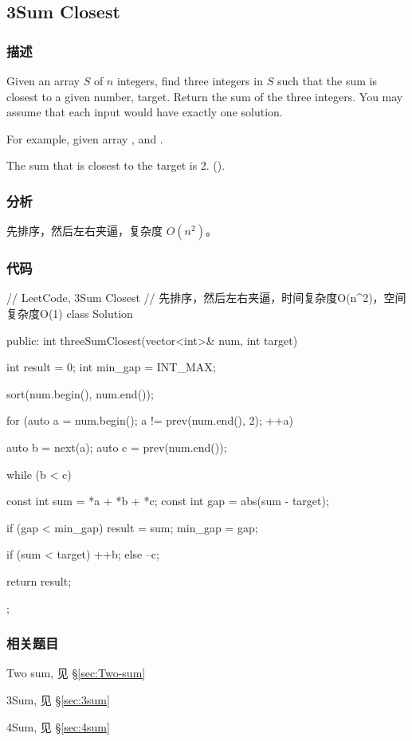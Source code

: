 \subsection{3Sum Closest} %
\label{sec:3sum-closest}


\subsubsection{描述}
Given an array $S$ of $n$ integers, find three integers in $S$ such that the sum is closest to a given number, target. Return the sum of the three integers. You may assume that each input would have exactly one solution.

For example, given array , and .

The sum that is closest to the target is 2. ().


\subsubsection{分析}
先排序，然后左右夹逼，复杂度 $O(n^2)$。


\subsubsection{代码}
\begin{Code}
// LeetCode, 3Sum Closest
// 先排序，然后左右夹逼，时间复杂度O(n^2)，空间复杂度O(1)
class Solution {
public:
    int threeSumClosest(vector<int>& num, int target) {
        int result = 0;
        int min_gap = INT_MAX;

        sort(num.begin(), num.end());

        for (auto a = num.begin(); a != prev(num.end(), 2); ++a) {
            auto b = next(a);
            auto c = prev(num.end());

            while (b < c) {
                const int sum = *a + *b + *c;
                const int gap = abs(sum - target);

                if (gap < min_gap) {
                    result = sum;
                    min_gap = gap;
                }

                if (sum < target) ++b;
                else              --c;
            }
        }

        return result;
    }
};
\end{Code}


\subsubsection{相关题目}
\begindot
\item Two sum, 见 \S \ref{sec:Two-sum}
\item 3Sum, 见 \S \ref{sec:3sum}
\item 4Sum, 见 \S \ref{sec:4sum}
\myenddot


